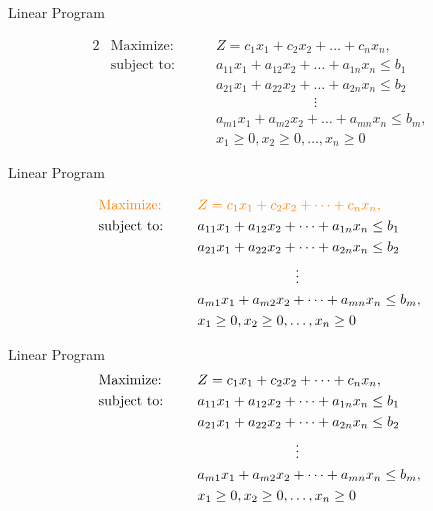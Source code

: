 \documentclass[10pt, compress]{beamer}
\begin{document}
\begin{frame}{Linear Program}

\begin{alignat*}{2}
  & \text{Maximize: } & & Z = c_1x_1 + c_2x_2 + \dots + c_nx_n, \\
   & \text{subject to: }& \quad & a_{11}x_1 + a_{12}x_2 + \dots + a_{1n}x_n \leq b_1 \\
   & & &  a_{21}x_1 + a_{22}x_2 + \dots + a_{2n}x_n \leq b_2 \\  
   & &  & \quad \quad \quad \quad \quad \quad \quad \vdots \\
   & & &  a_{m1}x_1 + a_{m2}x_2 + \dots + a_{mn}x_n \leq b_m, \\   
   & & & x_1 \geq 0, x_2 \geq 0, \dots ,  x_n \geq 0
     \end{alignat*}

\end{frame}

\begin{frame}{Linear Program}

\begin{alignat*}{2}
  & \color{orange}\text{Maximize: } & & \color{orange}Z = c_1x_1 + c_2x_2 + \dots + c_nx_n, \\
   & \text{subject to: }& \quad & a_{11}x_1 + a_{12}x_2 + \dots + a_{1n}x_n \leq b_1 \\
   & & &  a_{21}x_1 + a_{22}x_2 + \dots + a_{2n}x_n \leq b_2 \\  
   & &  & \quad \quad \quad \quad \quad \quad \quad \vdots \\
   & & &  a_{m1}x_1 + a_{m2}x_2 + \dots + a_{mn}x_n \leq b_m, \\   
   & & & x_1 \geq 0, x_2 \geq 0, \dots ,  x_n \geq 0
     \end{alignat*}

\end{frame}

\begin{frame}{Linear Program}
\color{orange}
\begin{alignat*}{2}
   & \color{black} \text{Maximize: } & &\color{black} Z = c_1x_1 + c_2x_2 + \dots + c_nx_n, \\
   & \text{subject to: }& \quad & a_{11}x_1 + a_{12}x_2 + \dots + a_{1n}x_n \leq b_1 \\
   & & &  a_{21}x_1 + a_{22}x_2 + \dots + a_{2n}x_n \leq b_2 \\  
   & &  & \quad \quad \quad \quad \quad \quad \quad \vdots \\
   & & &  a_{m1}x_1 + a_{m2}x_2 + \dots + a_{mn}x_n \leq b_m, \\   
   & & & \color{black} x_1 \geq 0, x_2 \geq 0, \dots ,  x_n \geq 0
     \end{alignat*}

\end{frame}
\end{document}
